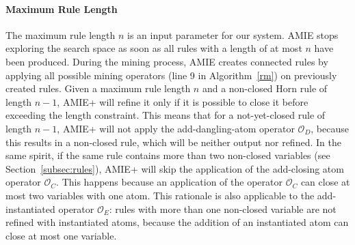 \paragraph{Maximum Rule Length}
% 
The maximum rule length $n$ is an input parameter for our system. AMIE stops exploring the search space as soon as all rules with 
a length of at most $n$ have been produced.
During the mining process, AMIE creates connected rules by applying all possible mining operators 
(line 9 in Algorithm~\ref{rm}) on previously created rules.
Given a maximum rule length $n$ and a non-closed Horn rule of length $n-1$, AMIE+
will refine it only if it is possible to close it before exceeding the length constraint.
This means that for a not-yet-closed rule of length $n-1$, AMIE+ will not apply 
the add-dangling-atom operator $\mathcal{O}_D$, because this results in a non-closed rule,
which will be neither output nor refined. In the same spirit, if the same rule contains more than
two non-closed variables (see Section~\ref{subsec:rules}), AMIE+ will skip the application of 
the add-closing atom operator $\mathcal{O}_C$. This happens because an application of the operator 
$\mathcal{O}_C$ can close at most two variables with one atom. 
This rationale is also applicable to the add-instantiated operator $\mathcal{O}_E$:
rules with more than one non-closed variable are not refined with instantiated atoms, 
because the addition of an instantiated atom can close at most one variable.

